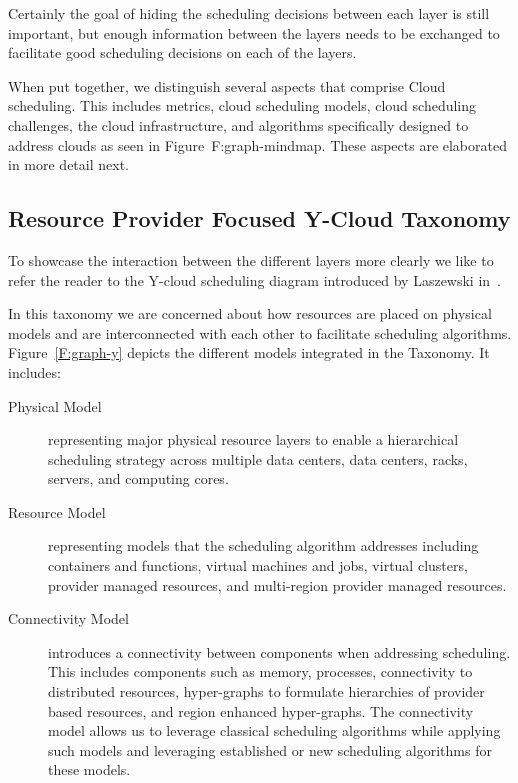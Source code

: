 \documentclass[final,5p,times,twocolumn]{elsarticle}
\begin{document}
Certainly the goal of hiding the scheduling decisions between each
layer is still important, but enough information between the layers
needs to be exchanged to facilitate good scheduling decisions on each
of the layers.

When put together, we distinguish several aspects that comprise Cloud
scheduling. This includes metrics, cloud scheduling models, cloud
scheduling challenges, the cloud infrastructure, and algorithms
specifically designed to address clouds as seen in Figure~{F:graph-mindmap}.
These aspects are elaborated in more detail next.



\subsection{Resource Provider Focused Y-Cloud Taxonomy}

To showcase the interaction between the different layers more clearly
we like to refer the reader to the Y-cloud scheduling diagram
introduced by Laszewski in~\cite{las18cloudscheduling-whitepaper}.

In this taxonomy we are concerned about how resources are placed on
physical models and are interconnected with each other to facilitate
scheduling algorithms. Figure~\ref{F:graph-y} depicts the different
models integrated in the Taxonomy. It includes:

\begin{description}

\item[Physical Model] representing major physical resource layers to
  enable a hierarchical scheduling strategy across multiple data
  centers, data centers, racks, servers, and computing cores.

\item[Resource Model] representing models that the scheduling
  algorithm addresses including containers and functions, virtual
  machines and jobs, virtual clusters, provider managed resources, and
  multi-region provider managed resources.

\item[Connectivity Model] introduces a connectivity between components
  when addressing scheduling. This includes components such as memory,
  processes, connectivity to distributed resources, hyper-graphs to
  formulate hierarchies of provider based resources, and region
  enhanced hyper-graphs. The connectivity model allows us to leverage
  classical scheduling algorithms while applying such models and
  leveraging established or new scheduling algorithms for these
  models.

\end{description}
\end{document}
